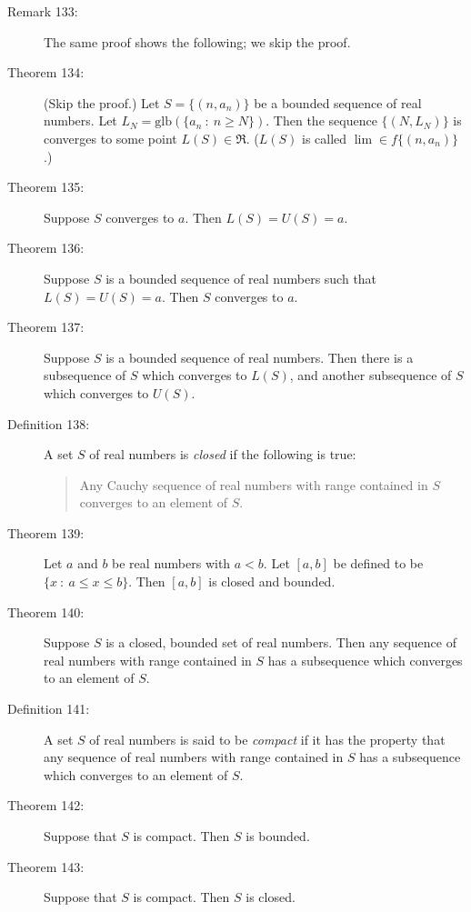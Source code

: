 \documentclass{article}
\begin{document}
\begin{description}
  \item[Remark 133:] The same proof shows the following; we skip the proof.

  \item[Theorem 134:] (Skip the proof.) Let $S = \{ (n, a_{n}) \}$ be a bounded sequence of real numbers. Let $L_{N} = \text{glb} ( \{ a_{n}\ :\ n \geq N \} )$. Then the sequence $\{ (N, L_{N}) \}$ is converges to some point $L(S) \in \Re$. ($L(S)$ is called $\lim \in f \{ (n, a_{n}) \}$.)

  \item[Theorem 135:] Suppose $S$ converges to $a$. Then $L(S) = U(S) = a$. 

  \item[Theorem 136:] Suppose $S$ is a bounded sequence of real numbers such that $L(S) = U(S) = a$. Then $S$ converges to $a$.

  \item[Theorem 137:] Suppose $S$ is a bounded sequence of real numbers. Then there is a subsequence of $S$ which converges to $L(S)$, and another subsequence of $S$ which converges to $U(S)$. 

  \item[Definition 138:] A set $S$ of real numbers is \emph{closed} if the following is true: 
    \begin{quote}
    Any Cauchy sequence of real numbers with range contained in $S$ converges to an element of $S$.
    \end{quote}

  \item[Theorem 139:] Let $a$ and $b$ be real numbers with $a < b$. Let $[a,b]$ be defined to be $\{ x\ :\ a \leq x \leq b \}$. Then $[a,b]$ is closed and bounded. 

  \item[Theorem 140:] Suppose $S$ is a closed, bounded set of real numbers. Then any sequence of real numbers with range contained in $S$ has a subsequence which converges to an element of $S$. 

  \item[Definition 141:] A set $S$ of real numbers is said to be \emph{compact} if it has the property that any sequence of real numbers with range contained in $S$ has a subsequence which converges to an element of $S$.

  \item[Theorem 142:] Suppose that $S$ is compact. Then $S$ is bounded. 

  \item[Theorem 143:] Suppose that $S$ is compact. Then $S$ is closed. 


\end{description}
\end{document}
